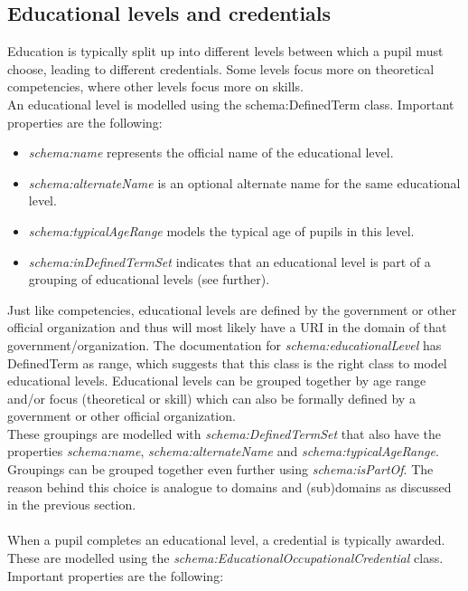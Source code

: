 \documentclass[a4paper]{report}
\begin{document}
    \subsection{Educational levels and credentials}

    Education is typically split up into different levels between which a pupil must choose, leading to different credentials. Some levels focus more on theoretical competencies, where other levels focus more on skills.\\
    An educational level is modelled using the schema:DefinedTerm class. Important properties are the following:
    \begin{itemize}
        \item \emph{schema:name} represents the official name of the educational level.
        \item \emph{schema:alternateName} is an optional alternate name for the same educational level.
        \item \emph{schema:typicalAgeRange} models the typical age of pupils in this level.
        \item \emph{schema:inDefinedTermSet} indicates that an educational level is part of a grouping of educational levels (see further).
    \end{itemize}

    \noindent Just like competencies, educational levels are defined by the government or other official organization and thus will most likely have a URI in the domain of that government/organization.
    The documentation for \textit{schema:educationalLevel} has DefinedTerm as range, which suggests that this class is the right class to model educational levels.
    Educational levels can be grouped together by age range and/or focus (theoretical or skill) which can also be formally defined by a government or other official organization.\\
    These groupings are modelled with \textit{schema:DefinedTermSet} that also have the properties \emph{schema:name}, \emph{schema:alternateName} and \emph{schema:typicalAgeRange}.\\
    Groupings can be grouped together even further using \emph{schema:isPartOf}.
    The reason behind this choice is analogue to domains and (sub)domains as discussed in the previous section.\\ \\
    When a pupil completes an educational level, a credential is typically awarded.
    These are modelled using the \emph{schema:EducationalOccupationalCredential} class. Important properties are the following:
\end{document}

